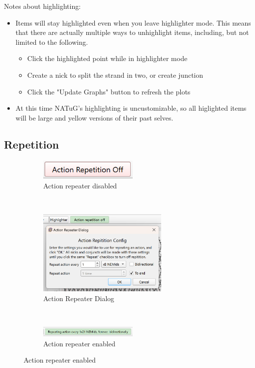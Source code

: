 \documentclass[titlepage]{article}
\begin{document}
Notes about highlighting:
\begin{itemize}
	\item Items will stay highlighted even when you leave highlighter mode. This means that there are actually multiple ways to unhighlight items, including, but not limited to the following.
	\begin{itemize}
		\item Click the highlighted point while in highlighter mode
		\item Create a nick to split the strand in two, or create junction
		\item Click the "Update Graphs" button to refresh the plots
	\end{itemize}

	\item At this time NATuG's highlighting is uncustomizable, so all higlighted items will be large and yellow versions of their past selves.
\end{itemize}

\subsection{Repetition}

\begin{figure}
	\centering
	\caption{Enabling the Action Repeater}
	\begin{subfigure}{.3\linewidth}
		\centering
		\includegraphics[width=1.9in]{action-repeater-disabled.png}
		\caption{Action repeater disabled}
	\end{subfigure}%
	~
	\begin{subfigure}{.4\linewidth}
		\centering
		\includegraphics[width=2.5in]{action-repeater-enablement.png}
		\caption{Action Repeater Dialog}
	\end{subfigure}%
	~
	\begin{subfigure}{.3\linewidth}
		\centering
		\includegraphics[width=1.9in]{action-repeater-enabled.png}
		\caption{Action repeater enabled}
	\end{subfigure}
\end{figure}
\end{document}
